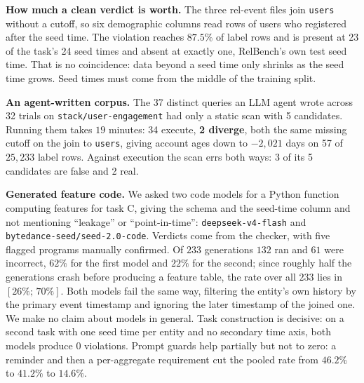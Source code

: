 \documentclass[conference]{IEEEtran}
\begin{document}
\textbf{How much a clean verdict is worth.} The three \mbox{rel-event} files join
\texttt{users} without a cutoff, so six demographic columns read rows of users who
registered after the seed time. The violation reaches $87.5\%$ of label rows and is
present at 23 of the task's 24 seed times and absent at exactly one, RelBench's own
test seed time. That is no coincidence: data beyond a seed time only shrinks as the seed
time grows. Seed times must come from the middle of the training split.

\textbf{An agent-written corpus.} The 37 distinct queries an LLM agent wrote across 32
trials on \texttt{stack/user-engagement} had only a static scan with 5 candidates.
Running them takes $19$ minutes: 34 execute, \textbf{2 diverge}, both the same missing
cutoff on the join to \texttt{users}, giving account ages down to $-2{,}021$ days on 57
of $25{,}233$ label rows. Against execution the scan errs both ways: 3 of its 5
candidates are false and 2 real.

\textbf{Generated feature code.} We asked two code models for a Python function
computing features for task C, giving the schema and the seed-time column and not
mentioning ``leakage'' or ``point-in-time'': \texttt{deepseek-v4-flash} and
\texttt{bytedance-seed/}\allowbreak\texttt{seed-2.0-code}. Verdicts come from the
checker, with five flagged programs manually confirmed. Of $233$ generations $132$ ran and $61$ were incorrect, $62\%$ for the first
model and $22\%$ for the second; since roughly half the generations crash before
producing a feature table, the rate over all $233$ lies in $[26\%;\,70\%]$. Both
models fail the same way, filtering the entity's own history by the primary event
timestamp and ignoring the later timestamp of the joined one. We make no claim about
models in general. Task construction is decisive: on a second task with one seed time per
entity and no secondary time axis, both models produce $0$ violations. Prompt guards help
partially but not to zero: a reminder and then a per-aggregate requirement cut the pooled
rate from $46.2\%$ to $41.2\%$ to $14.6\%$.
\end{document}
